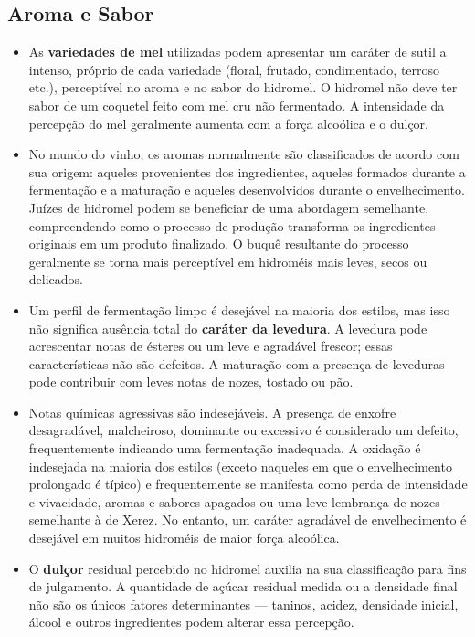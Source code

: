 \subsection*{Aroma e Sabor}

\begin{itemize}

\item As \textbf{variedades de mel} utilizadas podem apresentar um caráter de sutil a intenso, próprio de cada variedade (floral, frutado, condimentado, terroso etc.), perceptível no aroma e no sabor do hidromel. O hidromel não deve ter sabor de um coquetel feito com mel cru não fermentado. A intensidade da percepção do mel geralmente aumenta com a força alcoólica e o dulçor.
\item No mundo do vinho, os aromas normalmente são classificados de acordo com sua origem: aqueles provenientes dos ingredientes, aqueles formados durante a fermentação e a maturação e aqueles desenvolvidos durante o envelhecimento. Juízes de hidromel podem se beneficiar de uma abordagem semelhante, compreendendo como o processo de produção transforma os ingredientes originais em um produto finalizado. O buquê resultante do processo geralmente se torna mais perceptível em hidroméis mais leves, secos ou delicados.
\item Um perfil de fermentação limpo é desejável na maioria dos estilos, mas isso não significa ausência total do \textbf{caráter da levedura}. A levedura pode acrescentar notas de ésteres ou um leve e agradável frescor; essas características não são defeitos. A maturação com a presença de leveduras pode contribuir com leves notas de nozes, tostado ou pão.
\item Notas químicas agressivas são indesejáveis. A presença de enxofre desagradável, malcheiroso, dominante ou excessivo é considerado um defeito, frequentemente indicando uma fermentação inadequada. A oxidação é indesejada na maioria dos estilos (exceto naqueles em que o envelhecimento prolongado é típico) e frequentemente se manifesta como perda de intensidade e vivacidade, aromas e sabores apagados ou uma leve lembrança de nozes semelhante à de Xerez. No entanto, um caráter agradável de envelhecimento é desejável em muitos hidroméis de maior força alcoólica.
\item O \textbf{dulçor} residual percebido no hidromel auxilia na sua classificação para fins de julgamento. A quantidade de açúcar residual medida ou a densidade final não são os únicos fatores determinantes — taninos, acidez, densidade inicial, álcool e outros ingredientes podem alterar essa percepção.


\end{itemize}
